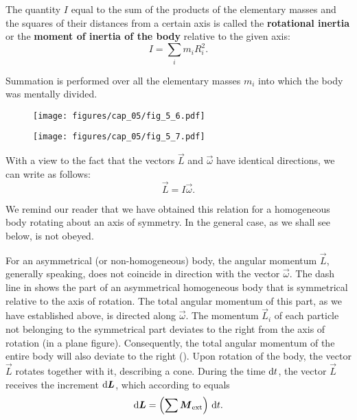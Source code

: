 \noindent
The quantity $I$ equal to the sum of the products of the elementary masses and the squares of their distances from a certain axis is called the \textbf{rotational inertia} or the \textbf{moment of inertia of the body} relative to the given axis:
\begin{equation}\label{eq:5_11}
I = \sum_i m_i R_i^2.
\end{equation}

\noindent
Summation is performed over all the elementary masses $m_i$ into which the body was mentally divided.

\begin{figure}[t]
	\begin{minipage}[t]{0.5\linewidth}
		\begin{center}
			\texttt{[image: figures/cap\_05/fig\_5\_6.pdf]}
			\caption[]{}
			\label{fig:5_6}
		\end{center}
	\end{minipage}
	\hspace{-0.05cm}
	\begin{minipage}[t]{0.5\linewidth}
		\begin{center}
			\texttt{[image: figures/cap\_05/fig\_5\_7.pdf]}
			\caption[]{}
			\label{fig:5_7}
		\end{center}
	\end{minipage}
\vspace{-0.7cm}
\end{figure}

With a view to the fact that the vectors $\vec{L}$ and $\vec{\omega}$ have identical directions, we can write  as follows:
\begin{equation}\label{eq:5_12}
\vec{L} = I \vec{\omega}.
\end{equation}

\noindent
We remind our reader that we have obtained this relation for a homogeneous body rotating about an axis of symmetry. In the general case, as we shall see below,  is not obeyed.

For an asymmetrical (or non-homogeneous) body, the angular momentum $\vec{L}$, generally speaking, does not coincide in direction with the vector $\vec{\omega}$. The dash line in  shows the part of an asymmetrical homogeneous body that is symmetrical relative to the axis of rotation. The total angular momentum of this part, as we have established above, is directed along $\vec{\omega}$. The momentum $\vec{L}_i$ of each particle not belonging to the symmetrical part deviates to the right from the axis of rotation (in a plane figure). Consequently, the total angular momentum of the entire body will also deviate to the right (). Upon rotation of the body, the vector $\vec{L}$ rotates together with it, describing a cone. During the time $\mathrm{d} t$, the vector $\vec{L}$ receives the increment $\mathrm{d}\boldsymbol{L}$, which according to  equals
\begin{equation}\label{eq:5_13}
\mathrm{d}\boldsymbol{L} = \left( \sum \boldsymbol{M}_{\text{ext}} \right) \, \mathrm{d} t.
\end{equation}

